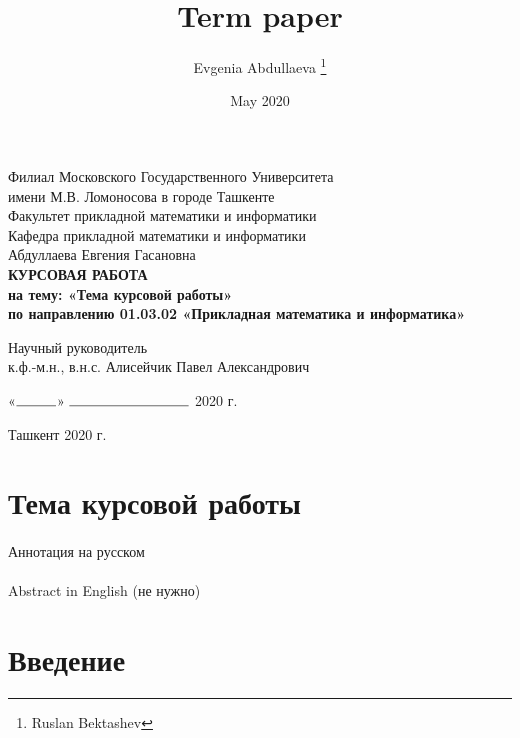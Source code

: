 \documentclass[12pt, a4paper, oneside]{article}
\title{Term paper}
\author{Evgenia Abdullaeva \thanks{Ruslan Bektashev}}
\date{May 2020}
\begin{document}
\begin{titlepage}
    \begin{center}
        Филиал Московского Государственного Университета\\
        имени М.В. Ломоносова в городе Ташкенте\\
        \vspace{0.5cm}
        Факультет прикладной математики и информатики\\
        Кафедра прикладной математики и информатики\\
        \vfill
        Абдуллаева Евгения Гасановна\\
        \vfill
        \textbf{КУРСОВАЯ РАБОТА\\
        на тему: «Тема курсовой работы»\\
        \vspace{0.5cm}
        по направлению 01.03.02 «Прикладная математика и информатика»}
    \end{center}
    \vfill
    \begin{flushleft}
        Научный руководитель\\
        к.ф.-м.н., в.н.с. Алисейчик Павел Александрович
    \end{flushleft}
    \vspace{0.5cm}
    \begin{flushright}
        «$\rule{1cm}{0.15mm}$» $\rule{3cm}{0.15mm}$ 2020 г.
    \end{flushright}
    \vfill
    \begin{center}
        Ташкент 2020 г.
    \end{center}
\end{titlepage}

\section*{Тема курсовой работы}
\paragraph{}
Аннотация на русском
\paragraph{}
Abstract in English (не нужно)
\setcounter{page}{2}
\newpage

\tableofcontents
\newpage

\section{Введение}
\end{document}
